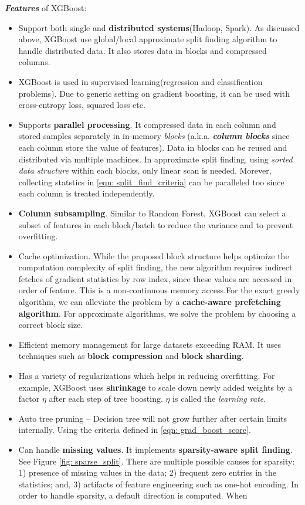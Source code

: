 \documentclass[11pt]{article}
\begin{document}
\textbf{\emph{Features}} of XGBoost:
\begin{itemize}
\item Support both single and \textbf{distributed systems}(Hadoop, Spark). As discussed above, XGBoost use global/local approximate split finding algorithm to handle distributed data. It also stores data in blocks and compressed columns. 
\item XGBoost is used in supervised learning(regression and classification problems). Due to generic setting on gradient boosting, it can be used with cross-entropy loss, squared loss etc.
\item Supports \textbf{parallel processing}. It compressed data in each column and stored samples separately in in-memory \emph{blocks} (a.k.a. \emph{\textbf{column blocks}} since each column store the value of features). Data in blocks can be reused and distributed via multiple machines. In approximate split finding, using \emph{sorted data structure} within each blocks, only linear scan is needed. Morever, collecting statstics in \eqref{eqn: split_find_criteria} can be paralleled too since each column is treated independently. 
\item \textbf{Column subsampling}. Similar to Random Forest, XGBoost can select a subset of features in each block/batch to reduce the variance and to prevent overfitting.
\item Cache optimization. While the proposed block structure helps optimize the computation complexity of split finding, the new algorithm requires indirect fetches of gradient statistics by row index, since these values are accessed in order of feature. This is a non-continuous memory access.For the exact greedy algorithm, we can alleviate the problem by a \textbf{cache-aware prefetching algorithm}. For approximate algorithms, we solve the problem by choosing a correct block size. 
\item Efficient memory management for large datasets exceeding RAM. It uses techniques such as \textbf{block compression} and \textbf{block sharding}. 
\item Has a variety of regularizations which helps in reducing overfitting. For example, XGBoost uses \textbf{shrinkage} to scale down newly added weights by a factor $\eta$ after each step of tree boosting. $\eta$ is called the \emph{learning rate}. 
\item Auto tree pruning – Decision tree will not grow further after certain limits internally. Using the criteria defined in \eqref{eqn: grad_boost_score}.
\item Can handle \textbf{missing values}. It implements \textbf{sparsity-aware split finding}. See Figure \ref{fig: sparse_split}.  There are multiple possible causes for sparsity: 1) presence of missing values in the data; 2) frequent zero entries in the statistics; and, 3) artifacts of feature engineering such as one-hot encoding. In order to handle sparsity, a default direction is computed. When

\end{itemize}
\end{document}
